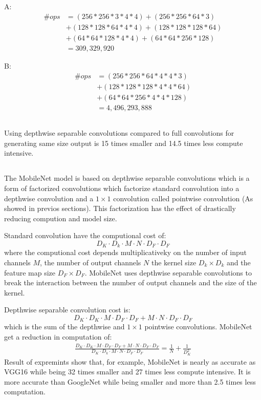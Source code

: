 \documentclass{article}
\begin{document}
\subsection{}
A:
\begin{align*}
    \# ops 
    &= (256*256*3*4*4) + (256*256*64*3) \\
    &+ (128*128*64*4*4) + (128*128*128*64) \\ 
    &+ (64*64*128*4*4) + (64*64*256*128) \\
    &= 309,329,920
\end{align*}

\noindent
B:
\begin{align*}
    \# ops
    &= (256*256*64*4*4*3) \\
    &+ (128*128*128*4*4*64) \\
    &+ (64*64*256*4*4*128) \\
    &= 4,496,293,888
\end{align*}


\subsection{}
Using depthwise separable convolutions compared to full convolutions for generating 
same size output is 15 times smaller and 14.5 times less compute intensive.

\subsection{}
The MobileNet model is based on depthwise separable convolutions which is a form of
factorized convolutions which factorize standard convolution into a depthwise 
convolution and a $1 \times 1$ convolution called pointwise convolution (As showed in 
previos sections). This factorization has the effect of drastically reducing compution and
model size.

Standard convolution have the computional cost of:
$$
    D_K \cdot D_k \cdot M \cdot N \cdot D_F \cdot D_F
$$
where the computional cost depends multiplicativeky on the number of input channels
$M$, the number of output channels $N$ the kernel size $D_k \times D_k$ and the 
feature map size $D_F \times D_F$. MobileNet uses depthwise separable convolutions to
break the interaction between the number of output channels and the size of the kernel.

Depthwise separable convolution cost is:
$$
    D_K \cdot D_K \cdot M \cdot D_F \cdot D_F + M \cdot N \cdot D_F \cdot D_F 
$$
which is the sum of the depthwise and $1 \times 1$ pointwise convolutions.
MobileNet get a reduction in computation of:
\begin{align*}
    \frac{D_K \cdot D_K \cdot M \cdot D_F \cdot D_F + M \cdot N \cdot D_F \cdot D_F }
    { D_K \cdot D_k \cdot M \cdot N \cdot D_F \cdot D_F}
    = \frac{1}{N} + \frac{1}{D_K^2}
\end{align*}
Result of expremints show that, for example, MobileNet is nearly as accurate as VGG16 while
being 32 times smaller and 27 times less compute intensive. It is more accurate than
GoogleNet while being smaller and more than 2.5 times less computation. 
\end{document}
